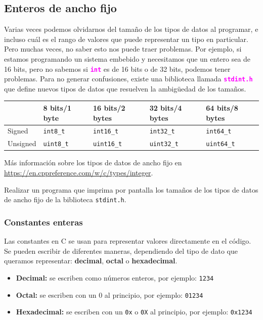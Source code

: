 \documentclass[]{scrartcl}
\newcommand{\hl}[1]{\textcolor{magenta}{\textbf{\texttt{#1}}}}
\begin{document}
\subsection*{Enteros de ancho fijo}

Varias veces podemos olvidarnos del tamaño de los tipos de datos al programar, e incluso cuál es el rango de valores que puede representar un tipo en particular. Pero muchas veces, no saber esto nos puede traer problemas. Por ejemplo, si estamos programando un sistema embebido y necesitamos que un entero sea de 16 bits, pero no sabemos si \hl{int} es de 16 bits o de 32 bits, podemos tener problemas.
Para no generar confusiones, existe una biblioteca llamada \hl{stdint.h} que define nuevos tipos de datos que resuelven la ambigüedad de los tamaños.

\begin{table}[!ht]
    \centering
    \begin{tabular}{|l|l|l|l|l|}
    \hline
        ~ & 8 bits/1 byte & 16 bits/2 bytes & 32 bits/4 bytes & 64 bits/8 bytes \\ \hline
        Signed & \texttt{int8\_t} & \texttt{int16\_t} & \texttt{int32\_t} & \texttt{int64\_t} \\ \hline
        Unsigned & \texttt{uint8\_t} & \texttt{uint16\_t} & \texttt{uint32\_t} & \texttt{uint64\_t} \\ \hline
    \end{tabular}
\end{table}

Más información sobre los tipos de datos de ancho fijo en \url{https://en.cppreference.com/w/c/types/integer}.
\begin{exbox}[label=ejercicio3]
  Realizar un programa que imprima por pantalla los tamaños de los tipos de datos de ancho fijo de la biblioteca \texttt{stdint.h}.
\end{exbox}

\subsubsection*{Constantes enteras}

Las constantes en C se usan para representar valores directamente en el código. Se pueden escribir de diferentes maneras, dependiendo del tipo de dato que queramos representar: \textbf{decimal}, \textbf{octal} o \textbf{hexadecimal}.

\begin{itemize}
  \item \textbf{Decimal:} se escriben como números enteros, por ejemplo: \texttt{1234}
  \item \textbf{Octal:} se escriben con un 0 al principio, por ejemplo: \texttt{01234}
  \item \textbf{Hexadecimal:} se escriben con un \texttt{0x} o \texttt{0X} al principio, por ejemplo: \texttt{0x1234}
\end{itemize}
\end{document}
